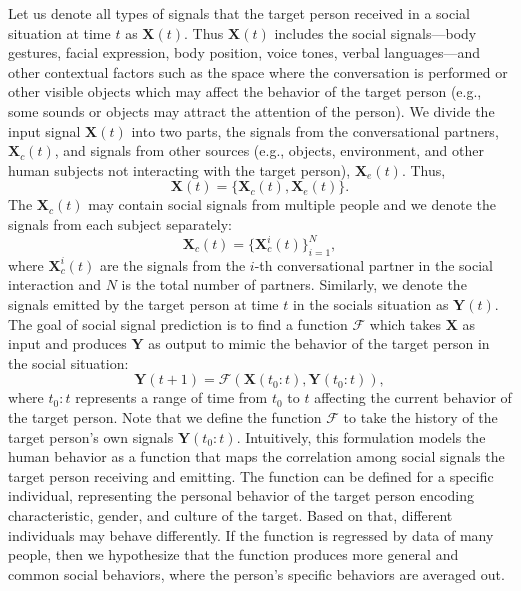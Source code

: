 Let us denote all types of signals that the target person received in a social situation at time $t$ as $\mathbf{X}(t)$. Thus $\mathbf{X}(t)$ includes the social signals---body gestures, facial expression, body position, voice tones, verbal languages---and other contextual factors such as the space where the conversation is performed or other visible objects which may affect the behavior of the target person (e.g., some sounds or objects may attract the attention of the person). We divide the input signal $\mathbf{X}(t)$ into two parts, the signals from the conversational partners, $\mathbf{X}_c(t)$, and signals from other sources (e.g., objects, environment, and other human subjects not interacting with the target person), $\mathbf{X}_e(t)$.  Thus,
\begin{equation}
\mathbf{X} (t) = \{  \mathbf{X}_c (t), \mathbf{X}_e (t)\}.
\end{equation}
The $\mathbf{X}_c (t)$ may contain social signals from multiple people and we denote the signals from each subject separately:
\begin{equation}
\mathbf{X}_c (t) = \{ \mathbf{X}_c^i (t) \}_{i=1}^N,
\end{equation}
where $\mathbf{X}^i_c (t)$ are the signals from the $i$-th conversational partner in the social interaction and $N$ is the total number of partners. 
Similarly, we denote the signals emitted by the target person at time $t$ in the socials situation as $\mathbf{Y} (t)$.
The goal of social signal prediction is to find a function $\mathcal{F}$ which takes $\mathbf{X}$ as input and produces $\mathbf{Y}$ as output to mimic the behavior of the target person in the social situation:
\begin{equation}
\mathbf{Y} (t+1) = \mathcal{F} \left( \mathbf{X} (t_0:t), \mathbf{Y} (t_0:t) \right),
\label{equation:socialPrediction_1}
\end{equation}
where $t_0:t$ represents a range of time from $t_0$ to $t$ affecting the current behavior of the target person. Note that we define the function $\mathcal{F}$ to take the history of the target person's own signals $\mathbf{Y} (t_0:t)$. Intuitively, this formulation models the human behavior as a function that maps the correlation among social signals the target person receiving and emitting. The function can be defined for a specific individual, representing the personal behavior of the target person encoding characteristic, gender, and culture of the target. Based on that, different individuals may behave differently. If the function is regressed by data of many people, then we hypothesize that the function produces more general and common social behaviors, where the person's specific behaviors are averaged out.

